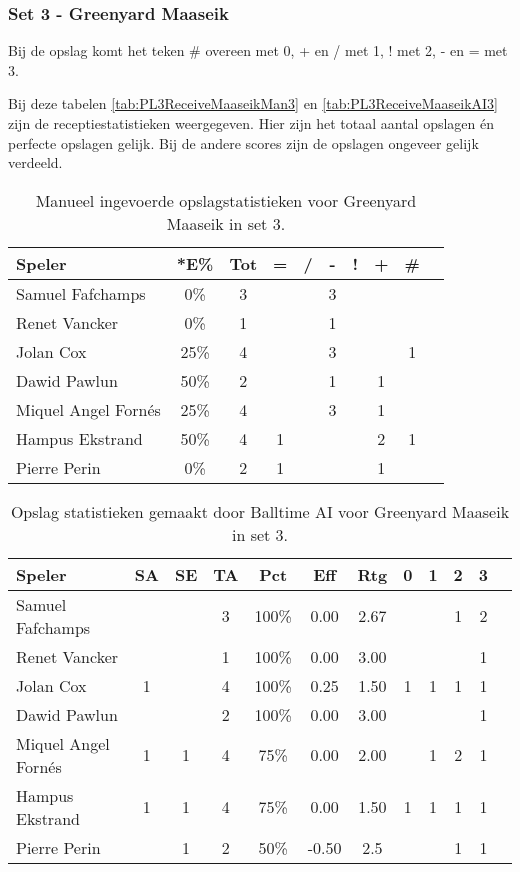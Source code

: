 \subsubsection{Set 3 - Greenyard Maaseik}
\label{sec:PL3_Greenyard3}
Bij de opslag komt het teken \# overeen met 0, + en / met 1, ! met 2, - en = met 3.

Bij deze tabelen \ref{tab:PL3ReceiveMaaseikMan3} en \ref{tab:PL3ReceiveMaaseikAI3} zijn de receptiestatistieken weergegeven. Hier zijn het totaal aantal opslagen én perfecte opslagen gelijk. Bij de andere scores zijn de opslagen ongeveer gelijk verdeeld.

\begin{table}[ht!]
    \centering
    \scriptsize
    \begin{tabular}{|l|c|c|c|c|c|c|c|c|c|} \hline
        \textbf{Speler} & *E\% & Tot & = & / & - & ! & + & \#\\ \hline
        Samuel Fafchamps & 0\% & 3 &  &  & 3 &  &  &  \\ 
        Renet Vancker & 0\% & 1 &  &  & 1 &  &  & \\ 
        Jolan Cox & 25\% & 4 &  &  & 3 &  &  & 1 \\ 
        Dawid Pawlun & 50\% & 2 &  &  & 1 &  & 1 &  \\ 
        Miquel Angel Fornés & 25\% & 4 &  &  & 3 &  & 1 &  \\ 
        Hampus Ekstrand & 50\% & 4 & 1 &  &  &  & 2 & 1 \\ 
        Pierre Perin & 0\% & 2 & 1 &  &  &  & 1 &  \\ \hline
    \end{tabular}
    \caption[Manueel ingevoerde opslagstatistieken voor Greenyard Maaseik in set 3]{\label{tab:PL3ServeMaaseikMan3}Manueel ingevoerde opslagstatistieken voor Greenyard Maaseik in set 3.}
\end{table}

\begin{table}[ht!]
  \centering
  \scriptsize
  \begin{tabular}{|l|c|c|c|c|c|c|c|c|c|c|c|} \hline
    \textbf{Speler} & SA & SE & TA & Pct & Eff & Rtg & 0 & 1 & 2 & 3 \\ \hline
    Samuel Fafchamps &  &  & 3 & 100\% & 0.00 & 2.67 &   &  & 1 & 2  \\
    Renet Vancker &  &  & 1 & 100\% & 0.00 & 3.00 &  &  &  & 1 \\
    Jolan Cox & 1 &  & 4 & 100\% & 0.25 & 1.50 & 1 & 1 & 1 & 1 \\
    Dawid Pawlun &  &  & 2 & 100\% & 0.00 & 3.00 &   &   & & 1 \\
    Miquel Angel Fornés & 1 & 1 & 4 & 75\% & 0.00 & 2.00 &   & 1 & 2 & 1 \\
    Hampus Ekstrand & 1 & 1 & 4 & 75\% & 0.00 & 1.50 & 1 & 1 & 1 & 1\\
    Pierre Perin & & 1 & 2 & 50\% & -0.50 & 2.5 &   &  & 1 & 1 \\ \hline
  \end{tabular}
  \caption[Opslagstatistieken gemaakt door Balltime AI voor Greenyard Maaseik in set 3]{\label{tab:PL3ServeMaaseikAI3}Opslag statistieken gemaakt door Balltime AI voor Greenyard Maaseik in set 3.}
\end{table}

